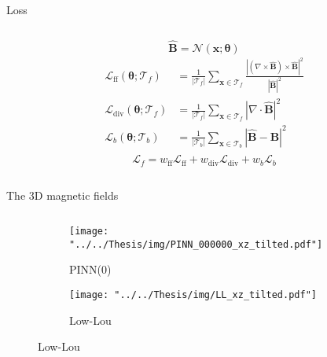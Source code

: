 \documentclass[aspectratio=169, serif]{beamer}
\begin{document}
\begin{frame}{Loss}
\begin{columns}
        \begin{column}{0.5\textwidth}
            \begin{equation*}
                \mathbf{\hat{B}}=\mathcal{N}(\boldsymbol{x}; \boldsymbol{\theta})
            \end{equation*}
            \begin{align*}
                \mathcal{L}_\text{ff}(\boldsymbol{\theta}; \mathcal{T}_f) & = \frac{1}{|\mathcal{T}_f|} \sum_{\boldsymbol{x}\in \mathcal{T}_f} \frac{|(\nabla \times \mathbf{\hat{B}})\times \mathbf{\hat{B}}|^2}{|\mathbf{\hat{B}}|^2}\\
                \mathcal{L}_\text{div}(\boldsymbol{\theta}; \mathcal{T}_f) & = \frac{1}{|\mathcal{T}_f|} \sum_{\boldsymbol{x}\in \mathcal{T}_f} |\nabla \cdot \mathbf{\hat{B}}|^2\\
                \mathcal{L}_b(\boldsymbol{\theta};\mathcal{T}_b) & = \frac{1}{|\mathcal{T}_b|}\sum_{\boldsymbol{x}\in\mathcal{T}_b}{|\mathbf{\hat{B}}-\mathbf{B}|^2}\\
            \end{align*}
            \begin{equation*}
                \mathcal{L}_f = w_{\text{ff}}\mathcal{L}_\text{ff}+ w_{\text{div}}\mathcal{L}_\text{div} + w_b\mathcal{L}_b
            \end{equation*}
        \end{column}
        \end{columns}
  \end{frame}

  \begin{frame}{The 3D magnetic fields}
    \begin{columns}
      \begin{column}{0.9\textwidth}
      \begin{figure}
          \begin{subfigure}{.5\linewidth}
              \centering
              \caption{\large PINN(0)}
              \texttt{[image: "../../Thesis/img/PINN\_000000\_xz\_tilted.pdf"]}
            \end{subfigure}%
            \begin{subfigure}{.5\linewidth}
              \centering
              \caption{\large Low-Lou}
              \texttt{[image: "../../Thesis/img/LL\_xz\_tilted.pdf"]}
            \end{subfigure}
        \end{figure}
      \end{column}
  \end{columns}
  \end{frame}
\end{document}

